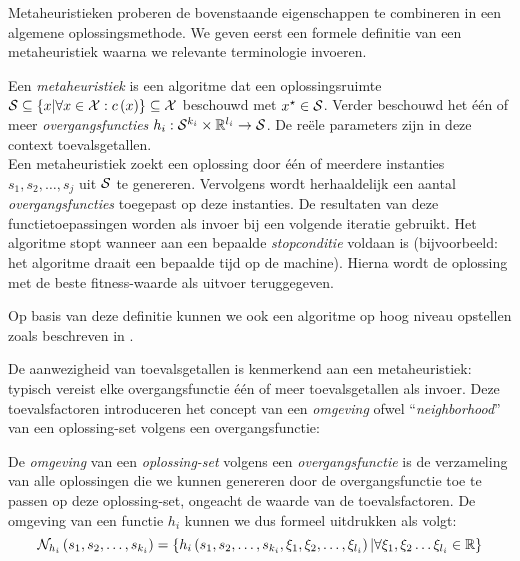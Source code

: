 Metaheuristieken proberen de bovenstaande eigenschappen te combineren in een algemene oplossingsmethode. We geven eerst een formele definitie van een metaheuristiek waarna we relevante terminologie invoeren.

\begin{definition}[Metaheuristiek]
Een \emph{metaheuristiek} is een algoritme dat een oplossingsruimte $\mathcal{S}\subseteq\left\{ x|\forall x\in \mathcal{X}:c\left(x\right)\right\}\subseteq\mathcal{X}$ beschouwd met $x^{\star}\in\mathcal{S}$. Verder beschouwd het \'e\'en of meer \emph{overgangsfuncties} $h_i:\mathcal{S}^{k_i}\times\mathbb{R}^{l_i}\rightarrow\mathcal{S}$. De re\"ele parameters zijn in deze context toevalsgetallen.\\
Een metaheuristiek zoekt een oplossing door \'e\'en of meerdere instanties $s_1,s_2,\ldots,s_j$ uit $\mathcal{S}$ te genereren. Vervolgens wordt herhaaldelijk een aantal \emph{overgangsfuncties} toegepast op deze instanties. De resultaten van deze functietoepassingen worden als invoer bij een volgende iteratie gebruikt. Het algoritme stopt wanneer aan een bepaalde \emph{stopconditie} voldaan is (bijvoorbeeld: het algoritme draait een bepaalde tijd op de machine). Hierna wordt de oplossing met de beste fitness-waarde als uitvoer teruggegeven.
\end{definition}

Op basis van deze definitie kunnen we ook een algoritme op hoog niveau opstellen zoals beschreven in .


De aanwezigheid van toevalsgetallen is kenmerkend aan een metaheuristiek: typisch vereist elke overgangsfunctie \'e\'en of meer toevalsgetallen als invoer. Deze toevalsfactoren introduceren het concept van een \emph{omgeving} ofwel ``\emph{neighborhood}'' van een oplossing-set volgens een overgangsfunctie:

\begin{definition}
De \emph{omgeving} van een \emph{oplossing-set} volgens een \emph{overgangsfunctie} is de verzameling van alle oplossingen die we kunnen genereren door de overgangsfunctie toe te passen op deze oplossing-set, ongeacht de waarde van de toevalsfactoren. De omgeving van een functie $h_i$ kunnen we dus formeel uitdrukken als volgt:
\begin{equation}
\mathcal{N}_{h_i}\left(s_1,s_2,\ldots,s_{k_i}\right)=\left\{ h_i\left(s_1,s_2,\ldots,s_{k_i},\xi_1,\xi_2,\ldots,\xi_{l_i}\right)|\forall \xi_1,\xi_2\ldots \xi_{l_i}\in\mathbb{R}\right\}
\end{equation}
\end{definition}

